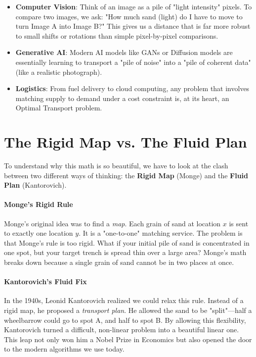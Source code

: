 \documentclass[
	a4paper,
	DIV=13,
	abstract=true,
	numbers=noenddot
]{scrartcl}
\begin{document}
\begin{itemize}
    \item \textbf{Computer Vision}: Think of an image as a pile of "light intensity" pixels. To compare two images, we ask: "How much sand (light) do I have to move to turn Image A into Image B?" This gives us a distance that is far more robust to small shifts or rotations than simple pixel-by-pixel comparisons.
    \item \textbf{Generative AI}: Modern AI models like GANs or Diffusion models are essentially learning to transport a "pile of noise" into a "pile of coherent data" (like a realistic photograph).
    \item \textbf{Logistics}: From fuel delivery to cloud computing, any problem that involves matching supply to demand under a cost constraint is, at its heart, an Optimal Transport problem.
\end{itemize}

\section{The Rigid Map vs. The Fluid Plan}
To understand why this math is so beautiful, we have to look at the clash between two different ways of thinking: the \textbf{Rigid Map} (Monge) and the \textbf{Fluid Plan} (Kantorovich).

\paragraph{Monge's Rigid Rule} Monge’s original idea was to find a \emph{map}. Each grain of sand at location $x$ is sent to exactly one location $y$. It is a "one-to-one" matching service. The problem is that Monge’s rule is too rigid. What if your initial pile of sand is concentrated in one spot, but your target trench is spread thin over a large area? Monge’s math breaks down because a single grain of sand cannot be in two places at once.

\paragraph{Kantorovich’s Fluid Fix} In the 1940s, Leonid Kantorovich realized we could relax this rule. Instead of a rigid map, he proposed a \emph{transport plan}. He allowed the sand to be "split"—half a wheelbarrow could go to spot A, and half to spot B. By allowing this flexibility, Kantorovich turned a difficult, non-linear problem into a beautiful linear one. This leap not only won him a Nobel Prize in Economics but also opened the door to the modern algorithms we use today.
\end{document}
